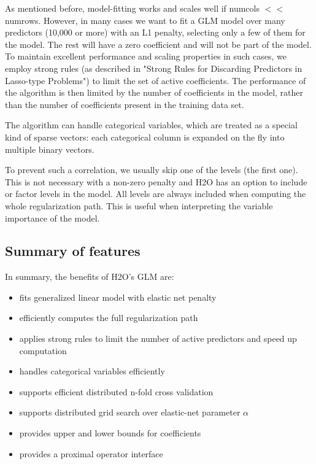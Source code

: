 \documentclass[11pt]{article}
\begin{document}
As mentioned before, model-fitting works and scales well if numcols $<<$ numrows. However, in many cases we want to fit a GLM model over many predictors (10,000 or more) with an L1 penalty, selecting only a few of them for the model. The rest will have a zero coefficient and will not be part of the model. To maintain excellent performance and scaling properties in such cases, we employ strong rules  (as described in "Strong Rules for Discarding Predictors in Lasso-type Problems") to limit the set of active coefficients. The performance of the algorithm is then limited by the number of coefficients in the model, rather than the number of coefficients present in the training data set. 

The algorithm can handle categorical variables, which are treated as a special kind of sparse vectors: each categorical column is expanded on the fly into multiple binary vectors. %

To prevent such a correlation, we usually skip one of the levels (the first one). This is not necessary with a non-zero penalty and H2O has an option to include or factor levels in the model. All levels are always included when computing the whole regularization path. This is useful when interpreting the variable importance of the model. 


\subsection{Summary of features} 
In summary, the benefits of H2O's GLM are:

\begin{itemize} %
\item fits generalized linear model with elastic net penalty
\item efficiently computes the full regularization path
\item applies strong rules to limit the number of active predictors and speed up computation
\item handles categorical variables efficiently
\item supports efficient distributed n-fold cross validation
\item supports distributed grid search over elastic-net parameter $\alpha$
\item provides upper and lower bounds for coefficients
\item provides a proximal operator interface
\end{itemize}
\end{document}
